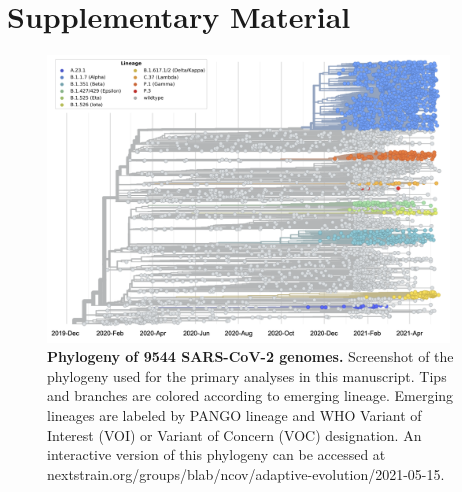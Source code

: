 \documentclass[11pt,oneside,letterpaper]{article}
\newcommand{\beginsupplement}{%
	\setcounter{figure}{0}
	\renewcommand{\thefigure}{S\arabic{figure}}%
}
\begin{document}
\section*{Supplementary Material}
\beginsupplement

\begin{figure}[h!]
	\centerline{\includegraphics[width=0.95\textwidth]{fig1_supp1.png}}
	\caption{\textbf{Phylogeny of 9544 SARS-CoV-2 genomes.}
	Screenshot of the phylogeny used for the primary analyses in this manuscript. Tips and branches are colored according to emerging lineage. Emerging lineages are labeled by PANGO lineage and WHO Variant of Interest (VOI) or Variant of Concern (VOC) designation. An interactive version of this phylogeny can be accessed at nextstrain.org/groups/blab/ncov/adaptive-evolution/2021-05-15.
	}
	\label{fig:fig1_supp1}
\end{figure}
\end{document}
